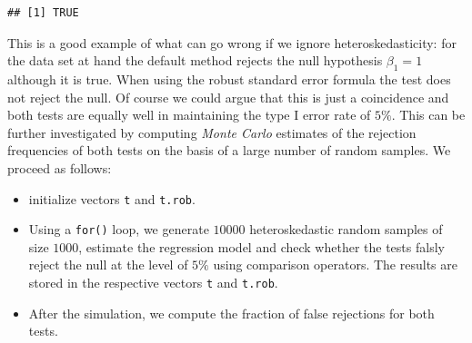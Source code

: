 \documentclass[]{book}
\providecommand{\tightlist}{%
  \setlength{\itemsep}{0pt}\setlength{\parskip}{0pt}}
\theoremstyle{definition}
\theoremstyle{definition}
\theoremstyle{definition}
\theoremstyle{remark}
\begin{document}
\begin{verbatim}
## [1] TRUE
\end{verbatim}

This is a good example of what can go wrong if we ignore
heteroskedasticity: for the data set at hand the default method rejects
the null hypothesis \(\beta_1 = 1\) although it is true. When using the
robust standard error formula the test does not reject the null. Of
course we could argue that this is just a coincidence and both tests are
equally well in maintaining the type I error rate of \(5\%\). This can
be further investigated by computing \emph{Monte Carlo} estimates of the
rejection frequencies of both tests on the basis of a large number of
random samples. We proceed as follows:

\begin{itemize}
\tightlist
\item
  initialize vectors \texttt{t} and \texttt{t.rob}.
\item
  Using a \texttt{for()} loop, we generate \(10000\) heteroskedastic
  random samples of size \(1000\), estimate the regression model and
  check whether the tests falsly reject the null at the level of \(5\%\)
  using comparison operators. The results are stored in the respective
  vectors \texttt{t} and \texttt{t.rob}.
\item
  After the simulation, we compute the fraction of false rejections for
  both tests.
\end{itemize}
\end{document}

